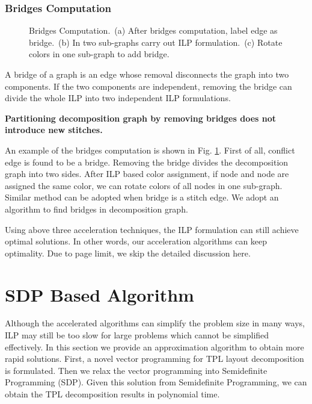 \documentclass[10pt,conference]{IEEEtran}
\begin{document}
\subsubsection{Bridges Computation}

\begin{figure}[tb]
	\centering
\vspace{0.2em}
	\vspace{0.2em}
\caption{Bridges Computation.~(a) After bridges computation, label edge  as bridge.~(b) In two sub-graphs carry out ILP formulation.~(c) Rotate colors in one sub-graph to add bridge.
	}
	\label{fig:bridge}
\end{figure}

A bridge of a graph is an edge whose removal disconnects the graph into two components.
If the two components are independent, removing the bridge can divide the whole ILP into two independent ILP formulations.

\begin{theorem}
\textbf{Partitioning decomposition graph by removing bridges does not introduce new stitches.}
\end{theorem}

An example of the bridges computation is shown in Fig. \ref{fig:bridge}.
First of all, conflict edge  is found to be a bridge. Removing the bridge divides the decomposition graph into two sides.
After ILP based color assignment, if node  and node  are assigned the same color,  we can rotate colors of all nodes in one sub-graph. Similar method can be adopted when bridge is a stitch edge.
We adopt an  algorithm \cite{1974Tarjan} to find bridges in decomposition graph.

Using above three acceleration techniques, the ILP formulation can still achieve optimal solutions.
In other words, our acceleration algorithms can keep optimality.
Due to page limit, we skip the detailed discussion here.

 \section{SDP Based Algorithm}
\label{chap:SDP}

Although  the accelerated algorithms can simplify the problem size in many ways, ILP may still be too slow for large problems which cannot be simplified effectively.
In this section we provide an approximation algorithm to obtain more rapid solutions.
First, a novel vector programming for TPL layout decomposition is formulated.
Then we relax the vector programming into Semidefinite Programming (SDP).
Given this solution from Semidefinite Programming, we can obtain the TPL decomposition results in polynomial time.
\end{document}
